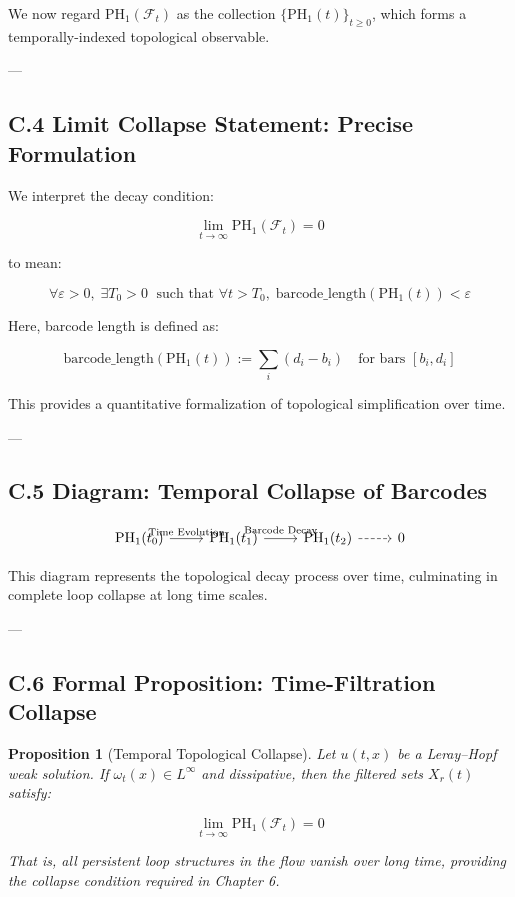 \documentclass[11pt]{article}
\newtheorem{proposition}[theorem]{Proposition}
\begin{document}
We now regard \( \mathrm{PH}_1(\mathcal{F}_t) \) as the collection \( \{ \mathrm{PH}_1(t) \}_{t \ge 0} \),  
which forms a temporally-indexed topological observable.

---

\subsection*{C.4 Limit Collapse Statement: Precise Formulation}

We interpret the decay condition:

\[
\lim_{t \to \infty} \mathrm{PH}_1(\mathcal{F}_t) = 0
\]

to mean:

\begin{equation}
\forall \varepsilon > 0,\; \exists T_0 > 0\; \text{ such that } \forall t > T_0,\;
\mathrm{barcode\_length}(\mathrm{PH}_1(t)) < \varepsilon
\end{equation}

Here, barcode length is defined as:

\[
\mathrm{barcode\_length}(\mathrm{PH}_1(t)) := \sum_{i} (d_i - b_i)
\quad \text{for bars } [b_i, d_i]
\]

This provides a quantitative formalization of topological simplification over time.

---

\subsection*{C.5 Diagram: Temporal Collapse of Barcodes}

\[
\begin{tikzcd}
\mathrm{PH}_1(t_0)
  \arrow[r, "\text{Time Evolution}"]
& \mathrm{PH}_1(t_1)
  \arrow[r, "\text{Barcode Decay}"]
& \mathrm{PH}_1(t_2)
  \arrow[r, dashed]
& 0
\end{tikzcd}
\]

This diagram represents the topological decay process over time,  
culminating in complete loop collapse at long time scales.

---

\subsection*{C.6 Formal Proposition: Time-Filtration Collapse}

\begin{proposition}[Temporal Topological Collapse]
Let \( u(t,x) \) be a Leray–Hopf weak solution.  
If \( \omega_t(x) \in L^\infty \) and dissipative, then the filtered sets \( X_r(t) \) satisfy:

\[
\lim_{t \to \infty} \mathrm{PH}_1(\mathcal{F}_t) = 0
\]

That is, all persistent loop structures in the flow vanish over long time,  
providing the collapse condition required in Chapter 6.
\end{proposition}
\end{document}
